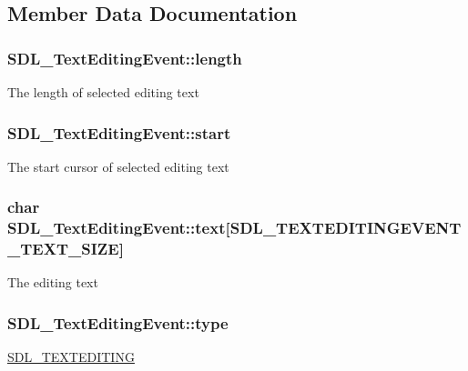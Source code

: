 \subsection{Member Data Documentation}
\hypertarget{struct_s_d_l___text_editing_event_adca95505c0bf212834930df58f6d1aa5}{}
\subsubsection[{length}]{ S\+D\+L\+\_\+\+Text\+Editing\+Event\+::length}\label{struct_s_d_l___text_editing_event_adca95505c0bf212834930df58f6d1aa5}
The length of selected editing text \hypertarget{struct_s_d_l___text_editing_event_ac6c6a00835d92b12c0ba5b78b5ad676d}{}
\subsubsection[{start}]{ S\+D\+L\+\_\+\+Text\+Editing\+Event\+::start}\label{struct_s_d_l___text_editing_event_ac6c6a00835d92b12c0ba5b78b5ad676d}
The start cursor of selected editing text \hypertarget{struct_s_d_l___text_editing_event_a29848c2e7819ea98ae8fb08543e6d420}{}
\subsubsection[{text}]{\setlength{\rightskip}{0pt plus 5cm}char S\+D\+L\+\_\+\+Text\+Editing\+Event\+::text\mbox{[}S\+D\+L\+\_\+\+T\+E\+X\+T\+E\+D\+I\+T\+I\+N\+G\+E\+V\+E\+N\+T\+\_\+\+T\+E\+X\+T\+\_\+\+S\+I\+Z\+E\mbox{]}}\label{struct_s_d_l___text_editing_event_a29848c2e7819ea98ae8fb08543e6d420}
The editing text \hypertarget{struct_s_d_l___text_editing_event_a198e6df194a3bf12cf5f82553e84c7cb}{}
\subsubsection[{type}]{ S\+D\+L\+\_\+\+Text\+Editing\+Event\+::type}\label{struct_s_d_l___text_editing_event_a198e6df194a3bf12cf5f82553e84c7cb}
\hyperlink{_s_d_l__events_8h_a3b589e89be6b35c02e0dd34a55f3fccaa1b80c465df69c0b6d06f026ce7a230e3}{S\+D\+L\+\_\+\+T\+E\+X\+T\+E\+D\+I\+T\+I\+N\+G} \hypertarget{struct_s_d_l___text_editing_event_a23b3e414cf7a7ccc547b7595ca930049}{}
